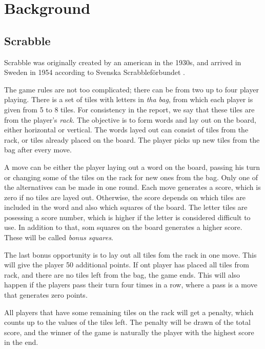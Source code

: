 \documentclass[a4paper, 12pt]{report}
\begin{document}
\chapter{Background}

\section{Scrabble}
Scrabble was originally created by an american in the 1930s, and arrived in Sweden in 1954 according to Svenska Scrabbleförbundet \cite{forbund}. 

The game rules are not too complicated; there can be from two up to four player playing. There is a set of tiles with letters in \emph{tha bag}, from which each player is given from 5 to 8 tiles. For consistency in the report, we say that these tiles are from the player's \emph{rack}. The objective is to form words and lay out on the board, either horizontal or vertical. The words layed out can consist of tiles from the rack, or tiles already placed on the board. The player picks up new tiles from the bag after every move.

A move can be either the player laying out a word on the board, passing his turn or changing some of the tiles on the rack for new ones from the bag. Only one of the alternatives can be made in one round. Each move generates a score, which is zero if no tiles are layed out. Otherwise, the score depends on which tiles are included in the word and also which squares of the board. The letter tiles are posessing a score number, which is higher if the letter is considered difficult to use. In addition to that, som squares on the board generates a higher score. These will be called \emph{bonus squares}. 

The last bonus opportunity is to lay out all tiles fom the rack in one move. This will give the player 50  additional points. If ont player has placed all tiles from rack, and there are no tiles left from the bag, the game ends. This will also happen if the players pass their turn four times in a row, where a pass is a move that generates zero points. 

All players that have some remaining tiles on the rack will get a penalty, which counts up to the values of the tiles left. The penalty will be drawn of the total score, and the winner of the game is naturally the player with the highest score in the end.
\end{document}
